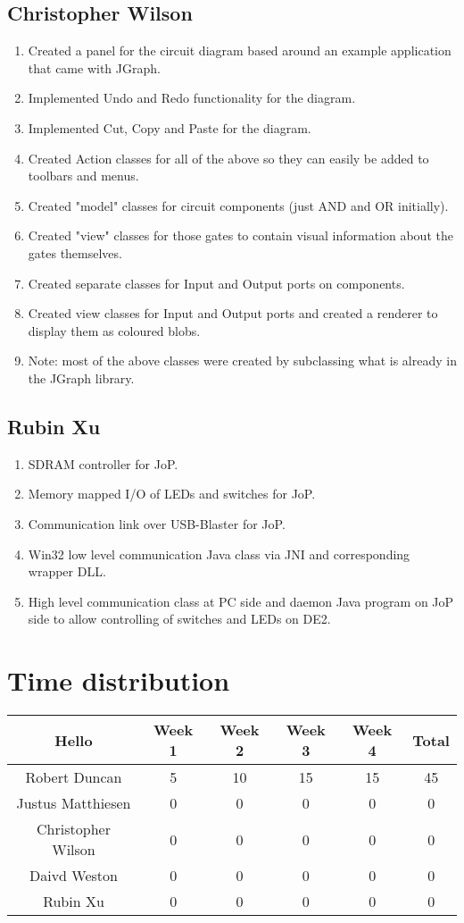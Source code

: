 \documentclass[12pt, a4paper, oneside,titlepage]{article}
\begin{document}
\subsection{Christopher Wilson}
\begin{enumerate}
    \item Created a panel for the circuit diagram based around an example application that came with JGraph.
    \item Implemented Undo and Redo functionality for the diagram.
    \item Implemented Cut, Copy and Paste for the diagram.
    \item Created Action classes for all of the above so they can easily be added to toolbars and menus.
    \item Created "model" classes for circuit components (just AND and OR initially).
    \item Created "view" classes for those gates to contain visual information about the gates themselves.
    \item Created separate classes for Input and Output ports on components.
    \item Created view classes for Input and Output ports and created a renderer to display them as coloured blobs.
    \item Note: most of the above classes were created by subclassing what is already in the JGraph library.
\end{enumerate}
\subsection{Rubin Xu}
\begin{enumerate}
\item SDRAM controller for JoP.
\item Memory mapped I/O of LEDs and switches for JoP.
\item Communication link over USB-Blaster for JoP.
\item Win32 low level communication Java class via JNI and corresponding wrapper DLL.
\item High level communication class at PC side and daemon Java program on JoP side to allow controlling of switches and LEDs on DE2.
\end{enumerate}
\section{Time distribution}
\begin{tabular}{|c | c | c | c | c | c|}
\hline
Hello & Week 1 & Week 2 & Week 3 & Week 4 & Total\\
\hline
Robert Duncan & 5 & 10 & 15 & 15 & 45\\
\hline
Justus Matthiesen & 0 & 0 & 0 & 0 & 0 \\
\hline
Christopher Wilson & 0 & 0 & 0 & 0 & 0\\
\hline
Daivd Weston & 0 & 0 & 0 & 0 & 0\\
\hline
Rubin Xu & 0 & 0 & 0 & 0 & 0\\
\hline
\end{tabular}
\end{document}
